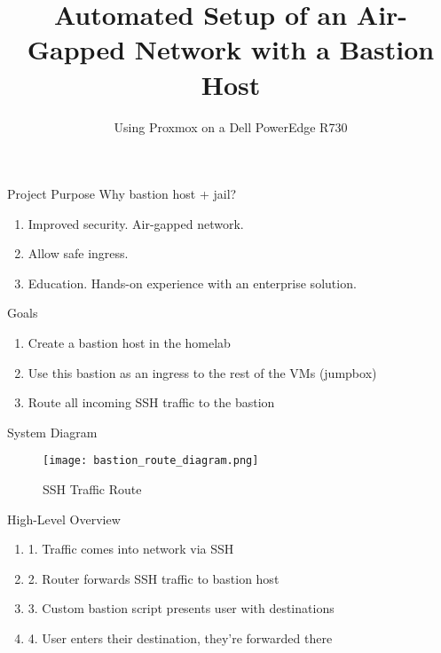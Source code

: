 \documentclass[14pt,compress,dvipsnames,aspectratio=169]{beamer} %
\title{\textbf{Automated Setup of an Air-Gapped Network with a Bastion Host}}
\author{Using Proxmox on a Dell PowerEdge R730}
\date{}  %
\begin{document}

\begin{frame}[plain]
\titlepage
\end{frame}



\begin{frame}{Project Purpose}
    Why bastion host + jail?
    \begin{enumerate}
        \item{Improved security. Air-gapped network.} 
        \item{Allow safe ingress.}
        \item{Education. Hands-on experience with an enterprise solution.}
    \end{enumerate}
\end{frame}



\begin{frame}{Goals}
    \begin{enumerate}
        \item{Create a bastion host in the homelab} 
        \item{Use this bastion as an ingress to the rest of the VMs (jumpbox)}
        \item{Route all incoming SSH traffic to the bastion}
    \end{enumerate}
\end{frame}


\begin{frame}{System Diagram}
    \begin{figure}
        \centering
        \texttt{[image: bastion\_route\_diagram.png]}
        \caption{SSH Traffic Route}
    \end{figure}
\end{frame}





\begin{frame}{High-Level Overview}
    \begin{enumerate}
        \item{1. Traffic comes into network via SSH} 
        \item{2. Router forwards SSH traffic to bastion host} 
        \item{3. Custom bastion script presents user with destinations}
        \item{4. User enters their destination, they're forwarded there}
    \end{enumerate}
\end{frame}
\end{document}

